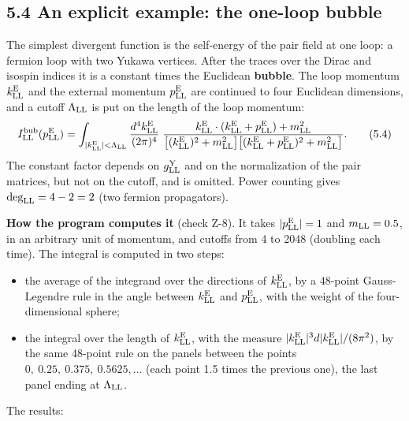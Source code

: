 \documentclass[
  10pt,
]{article}
\providecommand{\tightlist}{%
  \setlength{\itemsep}{0pt}\setlength{\parskip}{0pt}}
\begin{document}
\hypertarget{an-explicit-example-the-one-loop-bubble}{%
\subsection{5.4 An explicit example: the one-loop
bubble}\label{an-explicit-example-the-one-loop-bubble}}

The simplest divergent function is the self-energy of the pair field at
one loop: a fermion loop with two Yukawa vertices. After the traces over
the Dirac and isospin indices it is a constant times the Euclidean
\textbf{bubble}. The loop momentum \(k^{\rm E}_{\rm LL}\) and the
external momentum \(p^{\rm E}_{\rm LL}\) are continued to four Euclidean
dimensions, and a cutoff \(\Lambda_{\rm LL}\) is put on the length of
the loop momentum:
\[I^{\rm bub}_{\rm LL}(p^{\rm E}_{\rm LL})=\int_{\lvert k^{\rm E}_{\rm LL}\rvert<\Lambda_{\rm LL}}\frac{d^4k^{\rm E}_{\rm LL}}{(2\pi)^4}\;\frac{k^{\rm E}_{\rm LL}\cdot(k^{\rm E}_{\rm LL}+p^{\rm E}_{\rm LL})+m_{\rm LL}^2}{\big[(k^{\rm E}_{\rm LL})^2+m_{\rm LL}^2\big]\big[(k^{\rm E}_{\rm LL}+p^{\rm E}_{\rm LL})^2+m_{\rm LL}^2\big]} . \tag{5.4}\]
The constant factor depends on \(g^{\rm Y}_{\rm LL}\) and on the
normalization of the pair matrices, but not on the cutoff, and is
omitted. Power counting gives \(\deg_{\rm LL}=4-2=2\) (two fermion
propagators).

\textbf{How the program computes it} (check Z-8). It takes
\(\lvert p^{\rm E}_{\rm LL}\rvert=1\) and \(m_{\rm LL}=0.5\), in an
arbitrary unit of momentum, and cutoffs from 4 to 2048 (doubling each
time). The integral is computed in two steps:

\begin{itemize}
\tightlist
\item
  the average of the integrand over the directions of
  \(k^{\rm E}_{\rm LL}\), by a 48-point Gauss-Legendre rule in the angle
  between \(k^{\rm E}_{\rm LL}\) and \(p^{\rm E}_{\rm LL}\), with the
  weight of the four-dimensional sphere;
\item
  the integral over the length of \(k^{\rm E}_{\rm LL}\), with the
  measure
  \(\lvert k^{\rm E}_{\rm LL}\rvert^3d\lvert k^{\rm E}_{\rm LL}\rvert/(8\pi^2)\),
  by the same 48-point rule on the panels between the points
  \(0,\ 0.25,\ 0.375,\ 0.5625,\dots\) (each point 1.5 times the previous
  one), the last panel ending at \(\Lambda_{\rm LL}\).
\end{itemize}

The results:
\end{document}
